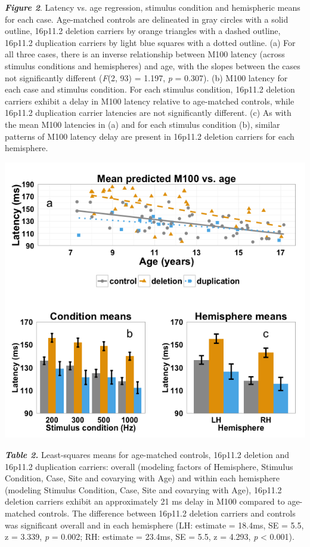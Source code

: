 \documentclass{article}
\begin{document}
\textbf{\emph{Figure 2}}. Latency vs. age regression, stimulus condition and hemispheric means for each case. Age-matched controls are delineated in gray circles with a solid outline, 16p11.2 deletion carriers by orange triangles with a dashed outline, 16p11.2 duplication carriers by light blue squares with a dotted outline.  (a) For all three cases, there is an inverse relationship between M100 latency (across stimulus conditions and hemispheres) and age, with the slopes between the cases not significantly different (\emph{F}(2, 93) = 1.197, \emph{p} = 0.307). (b) M100 latency for each case and stimulus condition. For each stimulus condition, 16p11.2 deletion carriers exhibit a delay in M100 latency relative to age-matched controls, while 16p11.2 duplication carrier latencies are not significantly different. (c) As with the mean M100 latencies in (a) and for each stimulus condition (b), similar patterns of M100 latency delay are present in 16p11.2 deletion carriers for each hemisphere.

\begin{center}
\includegraphics{figure-2-resubmssion.png}
\end{center}

\bigskip

\textbf{\emph{Table 2.}} Least-squares means for age-matched controls, 16p11.2 deletion and 16p11.2 duplication carriers: overall (modeling factors of Hemisphere, Stimulus Condition, Case, Site and covarying with Age) and within each hemisphere (modeling Stimulus Condition, Case, Site and covarying with Age), 16p11.2 deletion carriers exhibit an approximately 21 ms delay in M100 compared to age-matched controls. The difference between 16p11.2 deletion carriers and controls was significant overall and in each hemisphere (LH: estimate = 18.4ms, SE = 5.5, z = 3.339, \emph{p} = 0.002; RH: estimate = 23.4ms, SE = 5.5, z = 4.293, \emph{p} < 0.001).  
\end{document}
